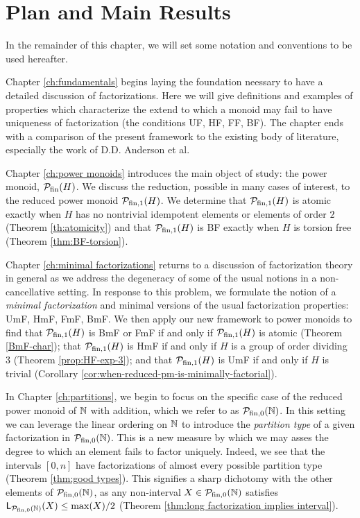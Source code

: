 

\section{Plan and Main Results}
In the remainder of this chapter, we will set some notation and conventions to be used hereafter.

Chapter \ref{ch:fundamentals} begins laying the foundation neessary to have a detailed discussion of factorizations.
Here we will give definitions and examples of properties which characterize the extend to which a monoid may fail to have uniqueness of factorization (the conditions UF, HF, FF, BF).  
The chapter ends with a comparison of the present framework to the existing body of literature, especially the work of D.D. Anderson et al.

Chapter \ref{ch:power monoids} introduces the main object of study: the power monoid, $\mathcal{P}_{\textrm{fin}}(H)$.
We discuss the reduction, possible in many cases of interest, to the reduced power monoid $\mathcal{P}_{\textrm{fin}, 1}(H)$.
We determine that $\mathcal{P}_{\textrm{fin}, 1}(H)$ is atomic exactly when $H$ has no nontrivial idempotent elements or elements of order $2$ (Theorem \ref{th:atomicity}) and that $\mathcal{P}_{\textrm{fin}, 1}(H)$ is BF exactly when $H$ is torsion free (Theorem \ref{thm:BF-torsion}).

Chapter \ref{ch:minimal factorizations} returns to a discussion of factorization theory in general as we address the degeneracy of some of the usual notions in a non-cancellative setting.  
In response to this problem, we formulate the notion of a \textit{minimal factorization} and minimal versions of the usual factorization properties: UmF, HmF, FmF, BmF.
We then apply our new framework to power monoids to find that $\mathcal{P}_{\textrm{fin}, 1}(H)$ is BmF or FmF if and only if $\mathcal{P}_{\textrm{fin}, 1}(H)$ is atomic (Theorem \ref{BmF-char}); that $\mathcal{P}_{\textrm{fin}, 1}(H)$ is HmF if and only if $H$ is a group of order dividing $3$ (Theorem \ref{prop:HF-exp-3}); and that $\mathcal{P}_{\textrm{fin}, 1}(H)$ is UmF if and only if $H$ is trivial (Corollary \ref{cor:when-reduced-pm-is-minimally-factorial}).

In Chapter \ref{ch:partitions}, we begin to focus on the specific case of the reduced power monoid of $\mathbb{N}$ with addition, which we refer to as ${\mathcal{P}_{\textrm{fin},0}(\mathbb{N})}$. 
In this setting we can leverage the linear ordering on $\mathbb{N}$ to introduce the \textit{partition type} of a given factorization in ${\mathcal{P}_{\textrm{fin},0}(\mathbb{N})}$.
This is a new measure by which we may asses the degree to which an element fails to factor uniquely.
Indeed, we see that the intervals $[0,n]$ have factorizations of almost every possible partition type (Theorem \ref{thm:good types}).
This signifies a sharp dichotomy with the other elements of ${\mathcal{P}_{\textrm{fin},0}(\mathbb{N})}$, as any non-interval $X\in {\mathcal{P}_{\textrm{fin},0}(\mathbb{N})}$ satisfies $\mathsf{L}_{\mathcal{P}_{\textrm{fin},0}(\mathbb{N})}(X) \le \max(X)/2$ (Theorem \ref{thm:long factorization implies interval}).

